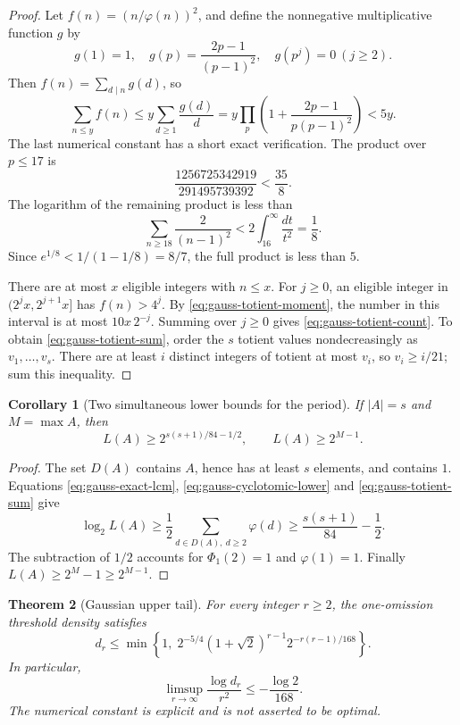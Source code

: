 \documentclass[11pt,a4paper]{article}
\newtheorem{theorem}{Theorem}[section]
\newtheorem{corollary}[theorem]{Corollary}
\theoremstyle{definition}
\theoremstyle{remark}\newtheorem{remark}[theorem]{Remark}
\begin{document}
\begin{proof}
Let $f(n)=(n/\varphi(n))^2$, and define the nonnegative multiplicative
function $g$ by
\[
 g(1)=1,\quad g(p)=\frac{2p-1}{(p-1)^2},\quad g(p^j)=0\ (j\geq2).
\]
Then $f(n)=\sum_{d\mid n}g(d)$, so
\begin{equation}\label{eq:gauss-totient-moment}
 \sum_{n\leq y} f(n)
 \leq y\sum_{d\geq1}\frac{g(d)}d
 =y\prod_p\left(1+\frac{2p-1}{p(p-1)^2}\right)<5y.
\end{equation}
The last numerical constant has a short exact verification.  The
product over $p\leq17$ is
\[
 \frac{1256725342919}{291495739392}<\frac{35}{8}.
\]
The logarithm of the remaining product is less than
\[
 \sum_{n\geq18}\frac{2}{(n-1)^2}
 <2\int_{16}^{\infty}\frac{dt}{t^2}=\frac18.
\]
Since $e^{1/8}<1/(1-1/8)=8/7$, the full product is less than $5$.

There are at most $x$ eligible integers with $n\leq x$.  For $j\geq0$,
an eligible integer in $(2^jx,2^{j+1}x]$ has $f(n)>4^j$.
By \eqref{eq:gauss-totient-moment}, the number in this interval is
at most $10x\,2^{-j}$.  Summing over $j\geq0$ gives
\eqref{eq:gauss-totient-count}.  To obtain
\eqref{eq:gauss-totient-sum}, order the $s$ totient values
nondecreasingly as $v_1,\ldots,v_s$.  There are at least $i$ distinct
integers of totient at most $v_i$, so $v_i\geq i/21$; sum this inequality.
\end{proof}

\begin{corollary}[Two simultaneous lower bounds for the period]
\label{cor:gauss-lcm-growth}
If $|A|=s$ and $M=\max A$, then
\begin{equation}\label{eq:gauss-lcm-two}
 L(A)\geq2^{s(s+1)/84-1/2},\qquad L(A)\geq2^{M-1}.
\end{equation}
\end{corollary}

\begin{proof}
The set $D(A)$ contains $A$, hence has at least $s$ elements, and contains
$1$.  Equations \eqref{eq:gauss-exact-lcm},
\eqref{eq:gauss-cyclotomic-lower} and
\eqref{eq:gauss-totient-sum} give
\[
 \log_2L(A)\geq\frac12\sum_{d\in D(A),\ d\geq2}\varphi(d)
 \geq\frac{s(s+1)}{84}-\frac12.
\]
The subtraction of $1/2$ accounts for $\Phi_1(2)=1$ and
$\varphi(1)=1$.  Finally $L(A)\geq2^M-1\geq2^{M-1}$.
\end{proof}

\begin{theorem}[Gaussian upper tail]
\label{thm:gaussian-omissions}
For every integer $r\geq2$, the one-omission threshold density satisfies
\begin{equation}\label{eq:gaussian-main}
 d_r\leq
 \min\left\{1,\;
 2^{-5/4}(1+\sqrt2)^{r-1}2^{-r(r-1)/168}\right\}.
\end{equation}
In particular,
\[
 \limsup_{r\to\infty}\frac{\log d_r}{r^2}
 \leq-\frac{\log2}{168}.
\]
The numerical constant is explicit and is not asserted to be optimal.
\end{theorem}
\end{document}
